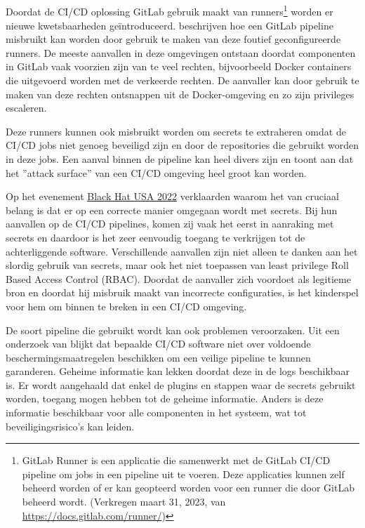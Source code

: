 \subsection{}
\label{sec:Praktische voorbeelden uit de securitywereld}
Doordat de CI/CD oplossing GitLab gebruik maakt van runners\footnote{GitLab Runner is een applicatie die samenwerkt met de GitLab CI/CD pipeline om jobs in een pipeline uit te voeren. Deze applicaties kunnen zelf beheerd worden of er kan geopteerd worden voor een runner die door GitLab beheerd wordt. (Verkregen maart 31, 2023, van \url{https://docs.gitlab.com/runner/})} worden er nieuwe kwetsbaarheden geïntroduceerd. \textcite{Haymore2022} beschrijven hoe een GitLab pipeline misbruikt kan worden door gebruik te maken van deze foutief geconfigureerde runners. De meeste aanvallen in deze omgevingen ontstaan doordat componenten in GitLab vaak voorzien zijn van te veel rechten, bijvoorbeeld Docker containers die uitgevoerd worden met de verkeerde rechten. De aanvaller kan door gebruik te maken van deze rechten ontsnappen uit de Docker-omgeving en zo zijn privileges escaleren.
\clearpage

Deze runners kunnen ook misbruikt worden om secrets te extraheren omdat de CI/CD jobs niet genoeg beveiligd zijn en door de repositories die gebruikt worden in deze jobs. Een aanval binnen de pipeline kan heel divers zijn en toont aan dat het ''attack surface'' van een CI/CD omgeving heel groot kan worden.
\newline

Op het evenement \href{https://www.blackhat.com/us-22/}{Black Hat USA 2022} verklaarden \textcite{Smart2022} waarom het van cruciaal belang is dat er op een correcte manier omgegaan wordt met secrets. Bij hun aanvallen op de CI/CD pipelines, komen zij vaak het eerst in aanraking met secrets en daardoor is het zeer eenvoudig toegang te verkrijgen tot de achterliggende software. Verschillende aanvallen zijn niet alleen te danken aan het slordig gebruik van secrets, maar ook het niet toepassen van least privilege Roll Based Access Control (RBAC). Doordat de aanvaller zich voordoet als legitieme bron en doordat hij misbruik maakt van incorrecte configuraties, is het kinderspel voor hem om binnen te breken in een CI/CD omgeving.
\newline

De soort pipeline die gebruikt wordt kan ook problemen veroorzaken. Uit een onderzoek van \textcite{Koishybayev2022} blijkt dat bepaalde CI/CD software niet over voldoende beschermingsmaatregelen beschikken om een veilige pipeline te kunnen garanderen. Geheime informatie kan lekken doordat deze in de logs beschikbaar is. Er wordt aangehaald dat enkel de plugins en stappen waar de secrets gebruikt worden, toegang mogen hebben tot de geheime informatie. Anders is deze informatie beschikbaar voor alle componenten in het systeem, wat tot beveiligingsrisico's kan leiden.
\newline 

